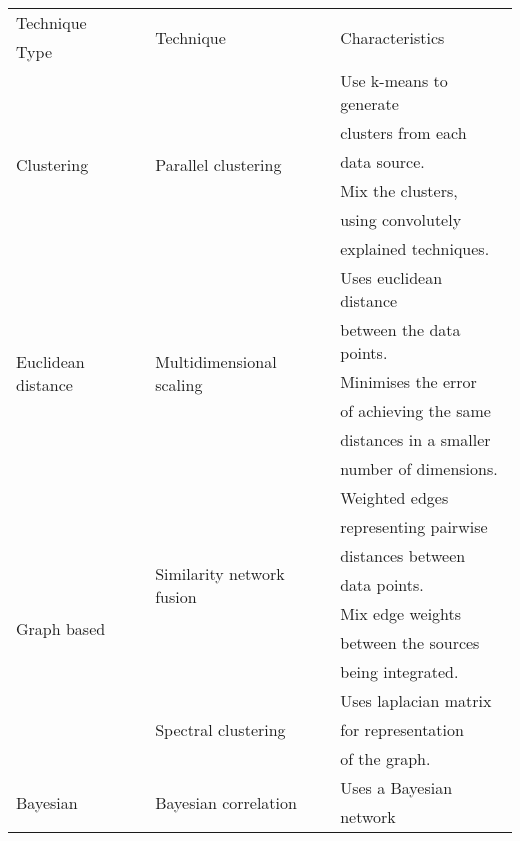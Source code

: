 \documentclass[11pt,a4paper,twoside,openright]{report}
\begin{document}
\begin{table}[hp]
\centering
\begin{tabular}{|l|l|l|}
\toprule
Technique & \multirow{2}{0.3\textwidth}{Technique}
          & \multirow{2}{0.39\textwidth}{Characteristics} \\
Type & & \\
\midrule
\midrule

\multirow{6}{0.2\textwidth}{Clustering}
& \multirow{6}{0.3\textwidth}{Parallel clustering\cite{greene2008}}
  & Use k-means to generate \\
& & clusters from each \\
& & data source. \\
\cline{3-3}
& & Mix the clusters, \\
& & using convolutely \\
& & explained techniques. \\
\hline

\multirow{6}{0.2\textwidth}{Euclidean distance}
& \multirow{6}{0.3\textwidth}{Multidimensional scaling\cite{kruskal1978}}
  & Uses euclidean distance \\
& & between the data points. \\
\cline{3-3}
& & Minimises the error \\
& & of achieving the same \\
& & distances in a smaller \\
& & number of dimensions. \\
\hline

\multirow{10}{0.2\textwidth}{Graph based}
& \multirow{7}{0.3\textwidth}{Similarity network fusion\cite{wang2014}}
  & Weighted edges \\
& & representing pairwise \\
& & distances between \\
& & data points. \\
\cline{3-3}
& & Mix edge weights \\
& & between the sources \\
& & being integrated. \\
\cline{2-3}
& \multirow{3}{0.3\textwidth}{Spectral clustering\cite{luxburg2007}}
  & Uses laplacian matrix\\
& & for representation \\
& & of the graph. \\
\hline

\multirow{2}{0.2\textwidth}{Bayesian}
& \multirow{2}{0.3\textwidth}{Bayesian correlation\cite{kirk2012}}
  & Uses a Bayesian \\
& & network \\
\hline


\end{tabular}
\end{table}
\end{document}

